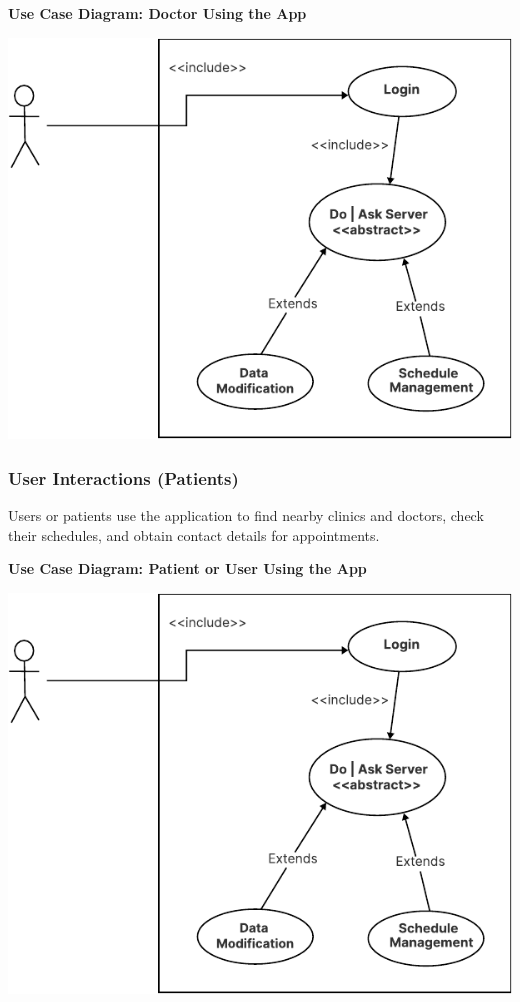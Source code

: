 \documentclass[12pt]{report}
\begin{document}
\vspace{0.5cm}
\noindent \textbf{Use Case Diagram: Doctor Using the App}
\begin{center}
	\includegraphics[width=\textwidth]{images/doctorCAS.pdf} %
\end{center}

\subsubsection{\textbf{User Interactions (Patients)}}
Users or patients use the application to find nearby clinics and doctors, check their schedules, and obtain contact details for appointments.

\vspace{0.5cm}
\noindent \textbf{Use Case Diagram: Patient or User Using the App}
\begin{center}
	\includegraphics[width=\textwidth]{images/doctorCAS.pdf} %
\end{center}
\end{document}
